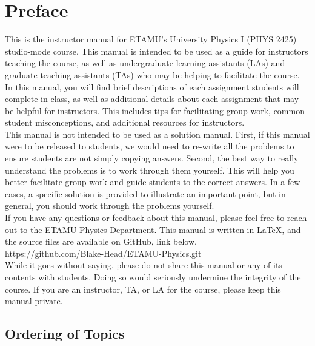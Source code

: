 \chapter{Preface}

This is the instructor manual for ETAMU's University Physics I (PHYS 2425) studio-mode course.
This manual is intended to be used as a guide for instructors teaching the course, as well as 
undergraduate learning assistants (LAs) and graduate teaching assistants (TAs) who may be helping
to facilitate the course. \\

In this manual, you will find brief descriptions of each assignment students will complete in class,
as well as additional details about each assignment that may be helpful for instructors.  This includes
tips for facilitating group work, common student misconceptions, and additional resources for instructors. \\

This manual is not intended to be used as a solution manual.  First, if this manual were to be released to students,
we would need to re-write all the problems to ensure students are not simply copying answers. Second, the best way 
to really understand the problems is to work through them yourself.  This will help you better facilitate group work
and guide students to the correct answers.  In a few cases, a specific solution is provided to illustrate an important
point, but in general, you should work through the problems yourself. \\

If you have any questions or feedback about this manual, please feel free to reach out to the ETAMU Physics Department. 
This manual is written in LaTeX, and the source files are available on GitHub, link below. \\

https://github.com/Blake-Head/ETAMU-Physics.git \\

While it goes without saying, please do not share this manual or any of its contents with students.  Doing so
would seriously undermine the integrity of the course.  If you are an instructor, TA, or LA for the course, please keep this manual
private. \\



\newpage
\section{Ordering of Topics}

